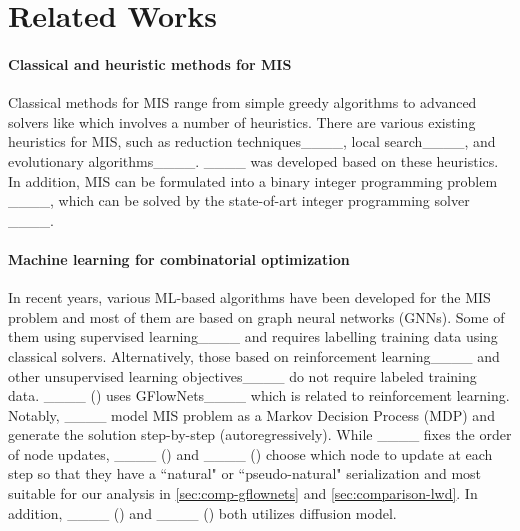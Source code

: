 \section{Related Works}
\label{sec:related-works}

\paragraph{Classical and heuristic methods for MIS}



Classical methods for MIS range from simple greedy algorithms to advanced solvers like \kamis which involves a number of heuristics. There are various existing heuristics for MIS, such as reduction techniques____, local search____, and evolutionary algorithms____. \kamis____ was developed based on these heuristics. In addition, MIS can be formulated into a binary integer programming problem ____, which can be solved by the state-of-art integer programming solver \gurobi____. 

\paragraph{Machine learning for combinatorial optimization}
In recent years, various ML-based algorithms have been developed for the MIS problem and most of them are based on graph neural networks (GNNs). Some of them using supervised learning____ and requires labelling training data using classical solvers. Alternatively, those based on reinforcement learning____ and other unsupervised learning objectives____ do not require labeled training data. ____ (\gflownets) uses GFlowNets____ which is related to reinforcement learning.
Notably, ____ model MIS problem as a Markov Decision Process (MDP) and generate the solution step-by-step (autoregressively). While ____ fixes the order of node updates, ____ (\lwd) and ____ (\gflownets) choose which node to update at each step so that they have a ``natural" or ``pseudo-natural" serialization and most suitable for our analysis in \cref{sec:comp-gflownets} and \cref{sec:comparison-lwd}. 
In addition, ____ (\difusco) and ____ (\diffuco) both utilizes diffusion model. 

